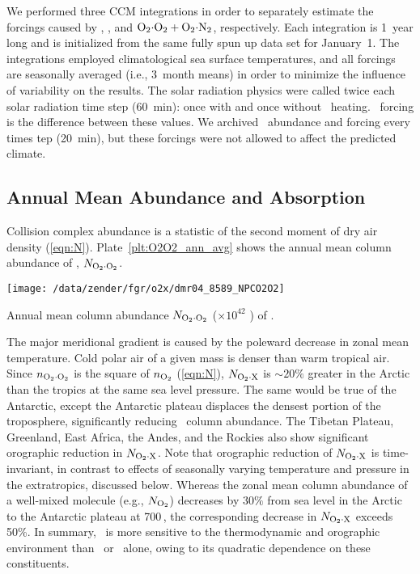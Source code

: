 \documentclass[agupp,twoside]{aguplus} %
\newlength{\fltwdtdblclm}\setlength{\fltwdtdblclm}{41.0pc} %
\begin{document}
We performed three CCM integrations in order to separately estimate
the forcings caused by \OdOd, \OdNd, and $\OdOd + \OdNd$,
respectively. 
Each integration is 1~year long and is initialized from the same
fully spun up data set for January~1. 
The integrations employed climatological sea surface temperatures, and
all forcings are seasonally averaged (i.e., 3~month means) in 
order to minimize the influence of variability on the results.
The solar radiation physics were called twice each solar radiation
time step (60~min): once with and once without \OdX\ heating. 
\OdX\ forcing is the difference between these values.
We archived \OdX\ abundance and forcing every times tep (20~min), but
these forcings were not allowed to affect the predicted climate. 

\subsection{Annual Mean Abundance and Absorption}\label{sxn:ann_avg}
Collision complex abundance is a statistic of the second moment of
dry air density (\ref{eqn:N}).
Plate~\ref{plt:O2O2_ann_avg} shows the annual mean column abundance
of \OdOd, $N_{\mathrm{O}_{2} \cdot \mathrm{O}_{2}}$.  
\begin{plate*}
\begin{center}
\texttt{[image: /data/zender/fgr/o2x/dmr04\_8589\_NPCO2O2]}\vfill
\end{center}
\caption{
Annual mean column abundance $N_{\mathrm{O}_{2} \cdot \mathrm{O}_{2}}$ ($\times 10^{42}$ \mlcSxcmF)
of \OdOd.  
\label{plt:O2O2_ann_avg}}   
\end{plate*}
The major meridional gradient is caused by the poleward decrease in
zonal mean temperature.
Cold polar air of a given mass is denser than warm tropical air.
Since $n_{\mathrm{O}_{2} \cdot \mathrm{O}_{2}}$ is the square of $n_{\mathrm{O}_{2}}$ (\ref{eqn:N}), $N_{\mathrm{O}_{2} \cdot \mathrm{X}}$ is 
$\sim 20\%$ greater in the Arctic than the tropics at the same sea
level pressure. 
The same would be true of the Antarctic, except the Antarctic plateau
displaces the densest portion of the troposphere, significantly
reducing \OdX\ column abundance.
The Tibetan Plateau, Greenland, East Africa, the Andes, and the
Rockies also show significant orographic reduction in $N_{\mathrm{O}_{2} \cdot \mathrm{X}}$.
Note that orographic reduction of $N_{\mathrm{O}_{2} \cdot \mathrm{X}}$ is time-invariant, in
contrast to effects of seasonally varying temperature and pressure in
the extratropics, discussed below.  
Whereas the zonal mean column abundance of a well-mixed molecule
(e.g., $N_{\mathrm{O}_{2}}$) decreases by $30\%$ from sea level in the Arctic to
the Antarctic plateau at 700\,\mb, the corresponding decrease in
$N_{\mathrm{O}_{2} \cdot \mathrm{X}}$ exceeds 50\%. 
In summary, \OdX\ is more sensitive to the thermodynamic and
orographic environment than \Od\ or \Nd\ alone, owing to its quadratic
dependence on these constituents.   
\end{document}
